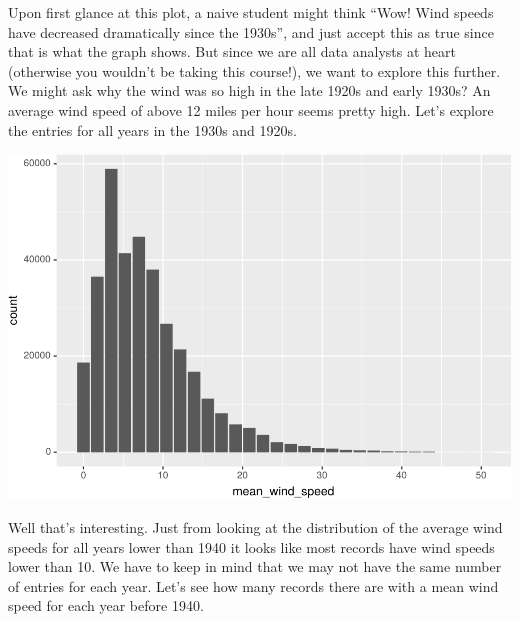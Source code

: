 \documentclass[]{krantz}
\makeatletter
\newenvironment{Shaded}{\begin{snugshade}}{\end{snugshade}}
\newcommand{\DecValTok}[1]{\textcolor[rgb]{0.06,0.06,0.06}{#1}}
\newcommand{\KeywordTok}[1]{\textcolor[rgb]{0.27,0.27,0.27}{\textbf{#1}}}
\newcommand{\NormalTok}[1]{#1}
\newcommand{\OperatorTok}[1]{\textcolor[rgb]{0.43,0.43,0.43}{\textbf{#1}}}
\newcommand{\StringTok}[1]{\textcolor[rgb]{0.5,0.5,0.5}{#1}}
\newenvironment{kframe}{%
\medskip{}
\setlength{\fboxsep}{.8em}
 \def\at@end@of@kframe{}%
 \ifinner\ifhmode%
  \def\at@end@of@kframe{\end{minipage}}%
  \begin{minipage}{\columnwidth}%
 \fi\fi%
 \def\FrameCommand##1{\hskip\@totalleftmargin \hskip-\fboxsep
 \colorbox{shadecolor}{##1}\hskip-\fboxsep
     \hskip-\linewidth \hskip-\@totalleftmargin \hskip\columnwidth}%
 \MakeFramed {\advance\hsize-\width
   \@totalleftmargin\z@ \linewidth\hsize
   \@setminipage}}%
 {\par\unskip\endMakeFramed%
 \at@end@of@kframe}
\renewenvironment{Shaded}{\begin{kframe}}{\end{kframe}}
\makeatother
\begin{document}
Upon first glance at this plot, a naive student might think ``Wow! Wind speeds have decreased dramatically since the 1930s'', and just accept this as true since that is what the graph shows. But since we are all data analysts at heart (otherwise you wouldn't be taking this course!), we want to explore this further. We might ask why the wind was so high in the late 1920s and early 1930s? An average wind speed of above 12 miles per hour seems pretty high. Let's explore the entries for all years in the 1930s and 1920s.

\begin{Shaded}
\end{Shaded}

\includegraphics{bookdown_files/figure-latex/unnamed-chunk-305-1.pdf}

Well that's interesting. Just from looking at the distribution of the average wind speeds for all years lower than 1940 it looks like most records have wind speeds lower than 10. We have to keep in mind that we may not have the same number of entries for each year. Let's see how many records there are with a mean wind speed for each year before 1940.
\end{document}
